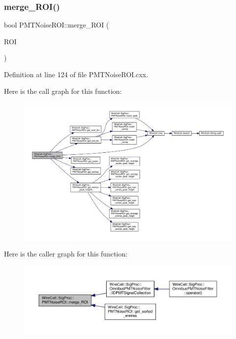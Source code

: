 \subsubsection{\texorpdfstring{merge\+\_\+\+R\+O\+I()}{merge\_ROI()}}
{\footnotesize\ttfamily bool P\+M\+T\+Noise\+R\+O\+I\+::merge\+\_\+\+R\+OI (\begin{DoxyParamCaption}\item[{\hyperlink{class_wire_cell_1_1_sig_proc_1_1_p_m_t_noise_r_o_i}{P\+M\+T\+Noise\+R\+OI} \&}]{R\+OI }\end{DoxyParamCaption})}



Definition at line 124 of file P\+M\+T\+Noise\+R\+O\+I.\+cxx.

Here is the call graph for this function\+:
\nopagebreak
\begin{figure}[H]
\begin{center}
\leavevmode
\includegraphics[width=350pt]{class_wire_cell_1_1_sig_proc_1_1_p_m_t_noise_r_o_i_a4b2640ed0856098cada1ba918b1e53d6_cgraph}
\end{center}
\end{figure}
Here is the caller graph for this function\+:
\nopagebreak
\begin{figure}[H]
\begin{center}
\leavevmode
\includegraphics[width=350pt]{class_wire_cell_1_1_sig_proc_1_1_p_m_t_noise_r_o_i_a4b2640ed0856098cada1ba918b1e53d6_icgraph}
\end{center}
\end{figure}
\mbox{\label{class_wire_cell_1_1_sig_proc_1_1_p_m_t_noise_r_o_i_adcf6d65537ca5b9853a3801251f97d8e}} 
